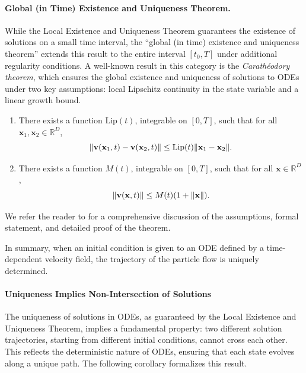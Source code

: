 \paragraph{Global (in Time) Existence and Uniqueness Theorem.}
While the Local Existence and Uniqueness Theorem guarantees the existence of solutions on a small time interval, the ``global (in time) existence and uniqueness theorem'' extends this result to the entire interval $[t_0, T]$ under additional regularity conditions. A well-known result in this category is the \emph{Carathéodory theorem}, which ensures the global existence and uniqueness of solutions to ODEs under two key assumptions: local Lipschitz continuity in the state variable and a linear growth bound.

\begin{enumerate}[label=(\roman*)]
    \item {} There exists a function $\mathrm{Lip}(t)$, integrable on $[0, T]$, such that for all $\mathbf{x}_1, \mathbf{x}_2 \in \mathbb{R}^D$,
    \[
    \|{\mathbf{v}}(\mathbf{x}_1, t) - {\mathbf{v}}(\mathbf{x}_2, t)\| \leq \mathrm{Lip}(t) \|\mathbf{x}_1 - \mathbf{x}_2\|.
    \]
    
    \item {} There exists a function $M(t)$, integrable on $[0, T]$, such that for all $\mathbf{x} \in \mathbb{R}^D$,
    \[
    \|{\mathbf{v}}(\mathbf{x}, t)\| \leq M(t)(1 + \|\mathbf{x}\|).
    \]
\end{enumerate}
We refer the reader to \citep{reid1971ordinary} for a comprehensive discussion of the assumptions, formal statement, and detailed proof of the theorem.


In summary, when an initial condition is given to an ODE defined by a time-dependent velocity field, the trajectory of the particle flow is uniquely determined.

\paragraph{Uniqueness Implies Non-Intersection of Solutions} The uniqueness of solutions in ODEs, as guaranteed by the Local Existence and Uniqueness Theorem, implies a fundamental property: two different solution trajectories, starting from different initial conditions, cannot cross each other. This reflects the deterministic nature of ODEs, ensuring that each state evolves along a unique path. The following corollary formalizes this result.


